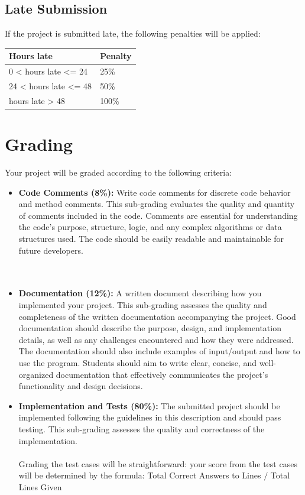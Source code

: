 \documentclass[12pt]{article}
\begin{document}
\subsection*{Late Submission}
If the project is submitted late, the following penalties will be applied:
\begin{table}[H]
\centering
\begin{tabular}{|l|l|}
\hline
\textbf{Hours late}                       & \textbf{Penalty} \\ \hline
0  \textless \vspace{1pt} hours late  \textless{}=  24  & 25\%             \\ %
24 \textless  \vspace{1pt} hours late  \textless{}=  48 & 50\%             \\
 hours late   \textgreater  \vspace{1pt}  48   & 100\%           \\ \hline

\end{tabular}
\end{table}



\section{Grading}
Your project will be graded according to the following criteria: 
\begin{itemize}
    \item \textbf{Code Comments (8\%): } Write code comments for discrete code behavior and method comments. This sub-grading evaluates the quality and quantity of comments included in the code. Comments are essential for understanding the code's purpose, structure, logic, and any complex algorithms or data structures used. The code should be easily readable and maintainable for future developers.\\\\\\
    \item \textbf{Documentation (12\%): } A written document describing how you implemented your project. This sub-grading assesses the quality and completeness of the written documentation accompanying the project. Good documentation should describe the purpose, design, and implementation details, as well as any challenges encountered and how they were addressed. The documentation should also include examples of input/output and how to use the program. Students should aim to write clear, concise, and well-organized documentation that effectively communicates the project's functionality and design decisions.
    \item \textbf{Implementation and Tests (80\%): } The submitted project should be implemented following the guidelines in this description and should pass testing. This sub-grading assesses the quality and correctness of the implementation.\\\\
    Grading the test cases will be straightforward: your score from the test cases will be determined by the formula:
    \center Total Correct Answers to Lines $/$ Total Lines Given
\end{itemize}
\end{document}
